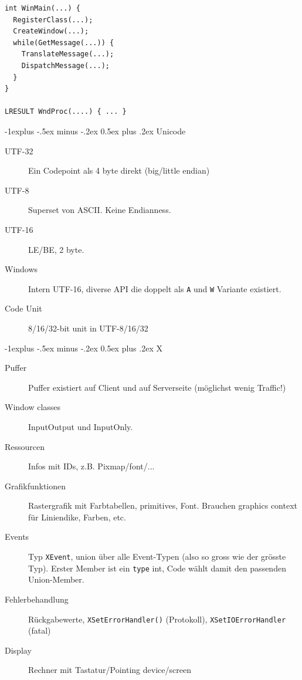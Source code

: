 \documentclass[10pt,landscape,a4paper]{article}
\makeatletter
\renewcommand{\subsection}{\@startsection{subsection}{2}{0mm}%
                                {-1explus -.5ex minus -.2ex}%
                                {0.5ex plus .2ex}%
                                {\normalfont\small\bfseries}}
\makeatother
\begin{document}
\begin{multicols*}{3}
\begin{verbatim}
int WinMain(...) {  
  RegisterClass(...);
  CreateWindow(...); 
  while(GetMessage(...)) { 
    TranslateMessage(...); 
    DispatchMessage(...);
  }
} 

LRESULT WndProc(....) { ... } 
\end{verbatim}

\columnbreak

\subsection{Unicode}

\begin{description}
  \item[UTF-32] Ein Codepoint als 4 byte direkt (big/little endian)
  \item[UTF-8] Superset von ASCII. Keine Endianness.
  \item[UTF-16] LE/BE, 2 byte.
  \item[Windows] Intern UTF-16, diverse API die doppelt als \verb|A| und
    \verb|W| Variante existiert.
  \item[Code Unit] 8/16/32-bit unit in UTF-8/16/32
\end{description}

\subsection{X}

\begin{description}
  \item[Puffer] Puffer existiert auf Client und auf Serverseite (möglichst wenig Traffic!)
  \item[Window classes] InputOutput und InputOnly.
  \item[Ressourcen] Infos mit IDs, z.B. Pixmap/font/...
  \item[Grafikfunktionen] Rastergrafik mit Farbtabellen, primitives, Font.
    Brauchen graphics context für Liniendike, Farben, etc.
  \item[Events] Typ \verb|XEvent|, union über alle Event-Typen (also so gross
    wie der grösste Typ). Erster Member ist ein \verb|type| int, Code wählt
    damit den passenden Union-Member.
  \item[Fehlerbehandlung] Rückgabewerte, \verb|XSetErrorHandler()| (Protokoll),
    \verb|XSetIOErrorHandler| (fatal)
  \item[Display] Rechner mit Tastatur/Pointing device/screen
\end{description}


\end{multicols*}
\end{document}
